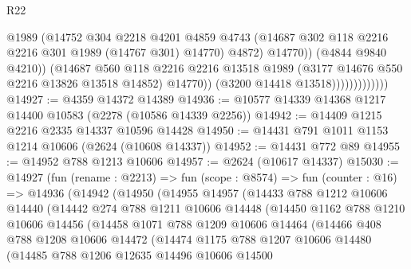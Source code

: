 \begin{lexlean}{R22}
\begin{coremodule}
                                    @1989
                                    (@14752
                                      @304
                                      @2218
                                      @4201
                                      @4859
                                      @4743
                                      (@14687 @302 @118 @2216 @2216 @301 @1989 (@14767 @301) @14770)
                                      @4872)
                                    @14770))
                                (@4844 @9840 @4210))
                              (@14687
                                @560
                                @118
                                @2216
                                @2216
                                @13518
                                @1989
                                (@3177 @14676 @550 @2216 @13826 @13518 @14852)
                                @14770))
                            (@3200 @14418 @13518)))))))))))))
@14927 := @4359 @14372 @14389
@14936 := @10577 @14339 @14368 @1217 @14400 @10583 (@2278 (@10586 @14339 @2256))
@14942 := @14409 @1215 @2216 @2335 @14337 @10596 @14428
@14950 := @14431 @791 @1011 @1153 @1214 @10606 (@2624 (@10608 @14337))
@14952 := @14431 @772 @89
@14955 := @14952 @788 @1213 @10606
@14957 := @2624 (@10617 @14337)
@15030 := @14927
    (fun (rename : @2213) =>
    fun (scope : @8574) =>
    fun (counter : @16) =>
    @14936
      (@14942
        (@14950
          (@14955
            @14957
            (@14433
              @788
              @1212
              @10606
              @14440
              (@14442
                @274
                @788
                @1211
                @10606
                @14448
                (@14450
                  @1162
                  @788
                  @1210
                  @10606
                  @14456
                  (@14458
                    @1071
                    @788
                    @1209
                    @10606
                    @14464
                    (@14466
                      @408
                      @788
                      @1208
                      @10606
                      @14472
                      (@14474
                        @1175
                        @788
                        @1207
                        @10606
                        @14480
                        (@14485
                          @788
                          @1206
                          @12635
                          @14496
                          @10606
                          @14500

\end{coremodule}
\end{lexlean}
